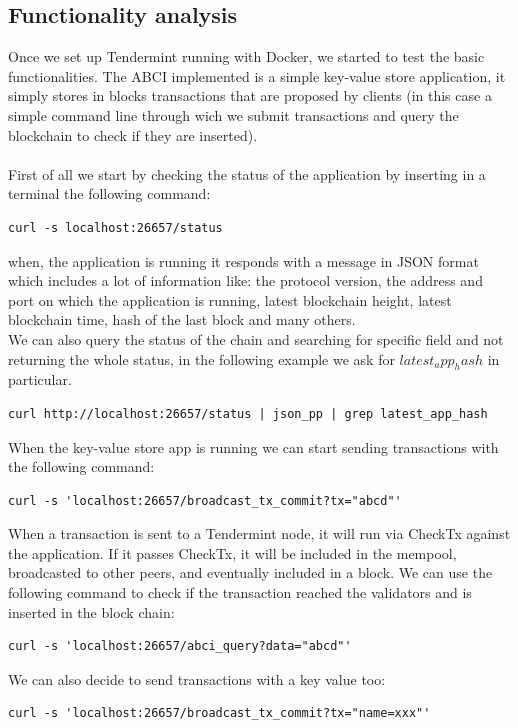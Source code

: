 \documentclass{article}
\begin{document}
	\subsection{Functionality analysis}
	Once we set up Tendermint running with Docker, we started to test the basic functionalities. The ABCI implemented is a simple key-value store application, it simply stores in blocks transactions that are proposed by clients (in this case a simple command line through wich we submit transactions and query the blockchain to check if they are inserted). \\ \\ 
	First of all we start by checking the status of the application by inserting in a terminal the following command:
	\begin{lstlisting}[style=bashstyle]
	curl -s localhost:26657/status
	\end{lstlisting}
	when, the application is running it responds with a message in JSON format which includes a lot of information like: the protocol version, the address and port on which the application is running, latest blockchain height, latest blockchain time, hash of the last block and many others. \\
	We can also query the status of the chain and searching for specific field and not returning the whole status, in the following example we ask for $latest_app_hash$ in particular.
	\begin{lstlisting}[style=bashstyle]
	curl http://localhost:26657/status | json_pp | grep latest_app_hash	
	\end{lstlisting}
	When the key-value store app is running we can start sending transactions with the following command:
	\begin{lstlisting}[style=bashstyle]
	curl -s 'localhost:26657/broadcast_tx_commit?tx="abcd"'
	\end{lstlisting}
	When a transaction is sent to a Tendermint node, it will run via CheckTx against the application. If it passes CheckTx, it will be included in the mempool, broadcasted to other peers, and eventually included in a block.
	We can use the following command to check if the transaction reached the validators and is inserted in the block chain:
	\begin{lstlisting}[style=bashstyle]
	curl -s 'localhost:26657/abci_query?data="abcd"'
	\end{lstlisting}
	We can also decide to send transactions with a key value too:
	\begin{lstlisting}[style=bashstyle]
	curl -s 'localhost:26657/broadcast_tx_commit?tx="name=xxx"'
	\end{lstlisting}
\end{document}
